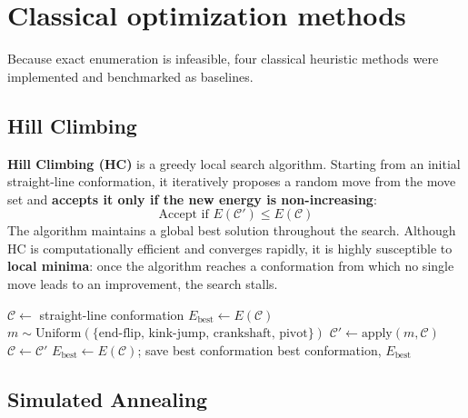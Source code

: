 \section{Classical optimization methods}
\label{cap2:sec_comp_methods}

Because exact enumeration is infeasible, four classical heuristic methods were implemented and benchmarked as baselines.

\subsection{Hill Climbing}
\label{cap2:subsec_hc}

\textbf{Hill Climbing (HC)} is a greedy local search algorithm. Starting from an initial straight-line conformation, it iteratively proposes a random move from the move set and \textbf{accepts it only if the new energy is non-increasing}:
\begin{equation}
    \text{Accept if } E(\mathcal{C}') \leq E(\mathcal{C})
    \label{eq:hc_accept}
\end{equation}
The algorithm maintains a global best solution throughout the search. Although HC is computationally efficient and converges rapidly, it is highly susceptible to \textbf{local minima}: once the algorithm reaches a conformation from which no single move leads to an improvement, the search stalls.

\begin{algorithm}[H]
\caption{Hill Climbing for HP folding}
\label{alg:hc}
\begin{algorithmic}[1]
\State $\mathcal{C} \leftarrow$ straight-line conformation
\State $E_{\text{best}} \leftarrow E(\mathcal{C})$
    \State $m \sim \text{Uniform}(\{\text{end-flip, kink-jump, crankshaft, pivot}\})$
    \State $\mathcal{C}' \leftarrow \text{apply}(m, \mathcal{C})$  
        \State $\mathcal{C} \leftarrow \mathcal{C}'$
            \State $E_{\text{best}} \leftarrow E(\mathcal{C})$; save best conformation
        \EndIf
    \EndIf
\EndFor
\State \Return best conformation, $E_{\text{best}}$
\end{algorithmic}
\end{algorithm}

\subsection{Simulated Annealing}
\label{cap2:subsec_sa}


